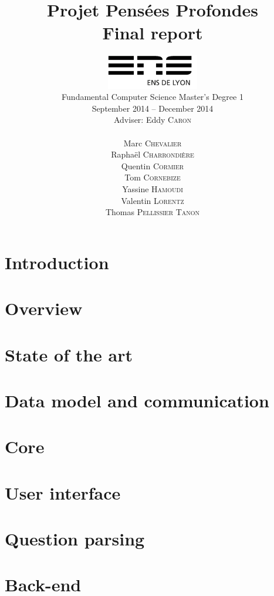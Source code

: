 \documentclass[a4paper,10pt]{report}
\title{Projet Pensées Profondes\\\large Final report}
\author{\includegraphics[width=0.3\textwidth]{../logo_ensl.pdf}\\[50pt]
Fundamental Computer Science Master's Degree 1\\September 2014 \--- December 2014\\[50pt]
Adviser: Eddy \textsc{Caron}\\[50pt]
\begin{minipage}{0.4\textwidth}
    \begin{flushleft} \large
        Marc \textsc{Chevalier}
        \\
        Raphaël \textsc{Charrondière}
        \\
        Quentin \textsc{Cormier}
        \\
        Tom \textsc{Cornebize}
    \end{flushleft}
\end{minipage}
\begin{minipage}{0.4\textwidth}
    \begin{flushright} \large
        Yassine \textsc{Hamoudi}
        \\
        Valentin \textsc{Lorentz}
        \\
        Thomas \textsc{Pellissier Tanon}
        \\
    \end{flushright}
\end{minipage}
}
\date{}
\begin{document}
\maketitle

\tableofcontents

\chapter*{Introduction}
    \label{introduction}
    

\chapter{Overview}
    

\chapter{State of the art}
    \label{stateofart}
    

\chapter{Data model and communication}
    \label{datamodel}
    

\chapter{Core}
    \label{core}
    

\chapter{User interface}
    \label{UI}
    

\chapter{Question parsing}
    \label{questionparsing}
    
    \label{grammatical}
    
    \label{reformulation}
    
    \label{standalone}
    

\chapter{Back-end}
    \label{wikidata}
    
    \label{cas}
    
    \label{spellchecker}
    
    \label{oeis}
    
\end{document}
